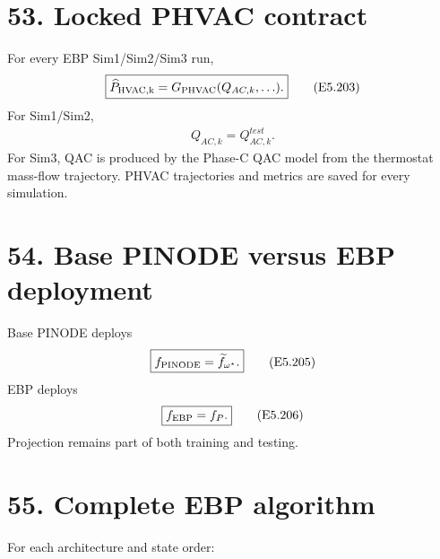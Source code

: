 \documentclass[11pt]{article}
\begin{document}
\section*{53. Locked PHVAC contract}

For every EBP Sim1/Sim2/Sim3 run,
\begin{align}
\boxed{\widehat P_{\rm HVAC,k}=G_{\rm PHVAC}(Q_{AC,k},\ldots).}
\tag{E5.203}
\end{align}
For Sim1/Sim2,
\begin{align}
\boxed{Q_{AC,k}=Q_{AC,k}^{test}.}
\tag{E5.204}
\end{align}
For Sim3, QAC is produced by the Phase-C QAC model from the thermostat mass-flow trajectory. PHVAC trajectories and metrics are saved for every simulation.

\section*{54. Base PINODE versus EBP deployment}

Base PINODE deploys
\begin{align}
\boxed{f_{\rm PINODE}=\widetilde f_{\omega^\star}.}
\tag{E5.205}
\end{align}
EBP deploys
\begin{align}
\boxed{f_{\rm EBP}=f_P.}
\tag{E5.206}
\end{align}
Projection remains part of both training and testing.

\section*{55. Complete EBP algorithm}

For each architecture and state order:
\end{document}
